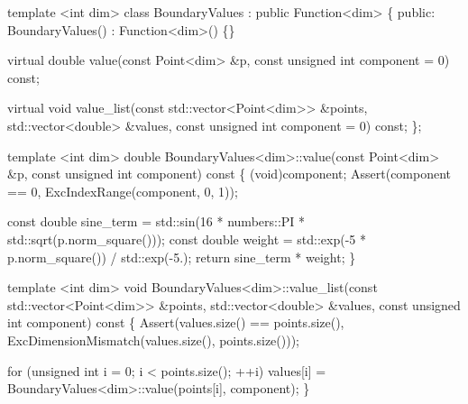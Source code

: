 \begin{DoxyCode}
\textcolor{keyword}{template} <\textcolor{keywordtype}{int} dim>
\textcolor{keyword}{class }BoundaryValues : \textcolor{keyword}{public} Function<dim> \{
\textcolor{keyword}{public}:
    BoundaryValues() : Function<dim>() \{\}

    \textcolor{keyword}{virtual} \textcolor{keywordtype}{double} value(\textcolor{keyword}{const} Point<dim> &p,
                         \textcolor{keyword}{const} \textcolor{keywordtype}{unsigned} \textcolor{keywordtype}{int} component = 0) \textcolor{keyword}{const};

    \textcolor{keyword}{virtual} \textcolor{keywordtype}{void} value\_list(\textcolor{keyword}{const} std::vector<Point<dim>> &points,
                            std::vector<double> &values,
                            \textcolor{keyword}{const} \textcolor{keywordtype}{unsigned} \textcolor{keywordtype}{int} component = 0) \textcolor{keyword}{const};
\};


\textcolor{keyword}{template} <\textcolor{keywordtype}{int} dim>
\textcolor{keywordtype}{double} BoundaryValues<dim>::value(\textcolor{keyword}{const} Point<dim> &p,
                                  \textcolor{keyword}{const} \textcolor{keywordtype}{unsigned} \textcolor{keywordtype}{int} component)\textcolor{keyword}{ const}
\textcolor{keyword}{}\{
    (void)component;
    Assert(component == 0, ExcIndexRange(component, 0, 1));

    \textcolor{keyword}{const} \textcolor{keywordtype}{double} sine\_term =
        std::sin(16 * numbers::PI * std::sqrt(p.norm\_square()));
    \textcolor{keyword}{const} \textcolor{keywordtype}{double} weight = std::exp(-5 * p.norm\_square()) / std::exp(-5.);
    \textcolor{keywordflow}{return} sine\_term * weight;
\}


\textcolor{keyword}{template} <\textcolor{keywordtype}{int} dim>
\textcolor{keywordtype}{void} BoundaryValues<dim>::value\_list(\textcolor{keyword}{const} std::vector<Point<dim>> &points,
                                     std::vector<double> &values,
                                     \textcolor{keyword}{const} \textcolor{keywordtype}{unsigned} \textcolor{keywordtype}{int} component)\textcolor{keyword}{ const}
\textcolor{keyword}{}\{
    Assert(values.size() == points.size(),
           ExcDimensionMismatch(values.size(), points.size()));

    \textcolor{keywordflow}{for} (\textcolor{keywordtype}{unsigned} \textcolor{keywordtype}{int} i = 0; i < points.size(); ++i)
        values[i] = BoundaryValues<dim>::value(points[i], component);
\}
\end{DoxyCode}


